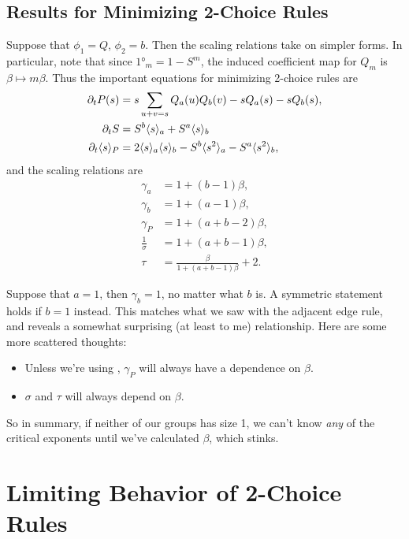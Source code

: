 \documentclass[twoside,10pt]{article}
\begin{document}
\subsection{Results for Minimizing 2-Choice Rules}

Suppose that $\phi_1 = Q$, $\phi_2 = b$. Then the scaling relations take on simpler forms. In particular, note that since $\ang{1}_{m} = 1 - S^{m}$, the induced coefficient map for $Q_m$ is $\beta \mapsto m \beta$. Thus the important equations for minimizing 2-choice rules are
\begin{align*}
        \partial_{t}{P(s)} &= s \sum_{u+v=s} Q_a(u) Q_b(v) - s Q_a(s) - s Q_b(s),\\
        \partial_{t}{S} &= S^{b}\langle s \rangle_{a} + S^{a}\langle s \rangle_{b}\\        \partial_{t}{\langle s \rangle_{P}} &= 2 \langle s \rangle_{a}\langle s \rangle_{b} - S^{b}\langle s^{2} \rangle_{a} - S^{a}\langle s^{2} \rangle_{b},
\end{align*}
and the scaling relations are
\begin{align*}
        \gamma_{a} &= 1 + (b-1)\beta,\\
        \gamma_{b} &= 1+(a-1)\beta,\\
        \gamma_{P} &= 1+(a+b-2)\beta,\\
        \frac{1}{\sigma} &= 1+(a+b-1)\beta,\\
        \tau &= \frac{\beta}{1+(a+b-1)\beta} +2.
\end{align*}

Suppose that $a=1$, then $\gamma_b=1$, no matter what $b$ is. A symmetric statement holds if $b=1$ instead. This matches what we saw with the adjacent edge rule, and reveals a somewhat surprising (at least to me) relationship. Here are some more scattered thoughts:
\begin{itemize}
        \item Unless we're using \ER, $\gamma_{P}$ will always have a dependence on $\beta$.
        \item $\sigma$ and $\tau$ will always depend on $\beta$.
\end{itemize}
So in summary, if neither of our groups has size 1, we can't know \textit{any} of the critical exponents until we've calculated $\beta$, which stinks.

\section{Limiting Behavior of 2-Choice Rules}
\end{document}
